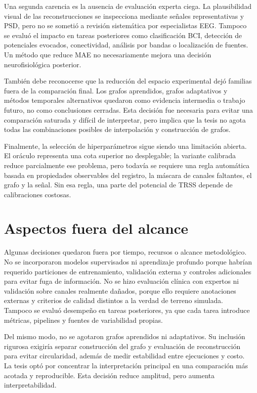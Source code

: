 Una segunda carencia es la ausencia de evaluación experta ciega. La plausibilidad visual de las reconstrucciones se inspecciona mediante señales representativas y PSD, pero no se sometió a revisión sistemática por especialistas EEG. Tampoco se evaluó el impacto en tareas posteriores como clasificación BCI, detección de potenciales evocados, conectividad, análisis por bandas o localización de fuentes. Un método que reduce MAE no necesariamente mejora una decisión neurofisiológica posterior.

También debe reconocerse que la reducción del espacio experimental dejó familias fuera de la comparación final. Los grafos aprendidos, grafos adaptativos y métodos temporales alternativos quedaron como evidencia intermedia o trabajo futuro, no como conclusiones cerradas. Esta decisión fue necesaria para evitar una comparación saturada y difícil de interpretar, pero implica que la tesis no agota todas las combinaciones posibles de interpolación y construcción de grafos.

Finalmente, la selección de hiperparámetros sigue siendo una limitación abierta. El oráculo representa una cota superior no desplegable; la variante calibrada reduce parcialmente ese problema, pero todavía se requiere una regla automática basada en propiedades observables del registro, la máscara de canales faltantes, el grafo y la señal. Sin esa regla, una parte del potencial de TRSS depende de calibraciones costosas.

\section{Aspectos fuera del alcance}

Algunas decisiones quedaron fuera por tiempo, recursos o alcance metodológico. No se incorporaron modelos supervisados ni aprendizaje profundo porque habrían requerido particiones de entrenamiento, validación externa y controles adicionales para evitar fuga de información. No se hizo evaluación clínica con expertos ni validación sobre canales realmente dañados, porque ello requiere anotaciones externas y criterios de calidad distintos a la verdad de terreno simulada. Tampoco se evaluó desempeño en tareas posteriores, ya que cada tarea introduce métricas, pipelines y fuentes de variabilidad propias.

Del mismo modo, no se agotaron grafos aprendidos ni adaptativos. Su inclusión rigurosa exigiría separar construcción del grafo y evaluación de reconstrucción para evitar circularidad, además de medir estabilidad entre ejecuciones y costo. La tesis optó por concentrar la interpretación principal en una comparación más acotada y reproducible. Esta decisión reduce amplitud, pero aumenta interpretabilidad.

